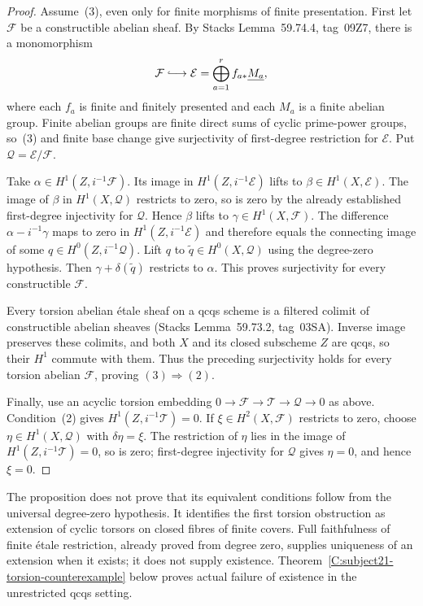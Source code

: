 \begin{proof}
Assume~(3), even only for finite morphisms of finite presentation.
First let $\mathcal F$ be a constructible abelian sheaf. By Stacks
Lemma~59.74.4, tag~09Z7, there is a monomorphism
\[
 \mathcal F\lhook\joinrel\longrightarrow
 \mathcal E=\bigoplus_{a=1}^{r}f_{a*}\underline{M_a},
\]
where each $f_a$ is finite and finitely presented and each $M_a$ is a
finite abelian group. Finite abelian groups are finite direct sums
of cyclic prime-power groups, so~(3) and finite base change give
surjectivity of first-degree restriction for $\mathcal E$.
Put $\mathcal Q=\mathcal E/\mathcal F$.

Take $\alpha\in H^1(Z,i^{-1}\mathcal F)$. Its image in
$H^1(Z,i^{-1}\mathcal E)$ lifts to $\beta\in H^1(X,\mathcal E)$.
The image of $\beta$ in $H^1(X,\mathcal Q)$ restricts to zero, so is
zero by the already established first-degree injectivity for
$\mathcal Q$. Hence $\beta$ lifts to $\gamma\in H^1(X,\mathcal F)$.
The difference $\alpha-i^{-1}\gamma$ maps to zero in
$H^1(Z,i^{-1}\mathcal E)$ and therefore equals the connecting image
of some $q\in H^0(Z,i^{-1}\mathcal Q)$. Lift $q$ to
$\widetilde q\in H^0(X,\mathcal Q)$ using the degree-zero hypothesis.
Then $\gamma+\delta(\widetilde q)$ restricts to $\alpha$.
This proves surjectivity for every constructible $\mathcal F$.

Every torsion abelian \'etale sheaf on a qcqs scheme is a filtered
colimit of constructible abelian sheaves (Stacks Lemma~59.73.2,
tag~03SA). Inverse image preserves these colimits, and both $X$ and
its closed subscheme $Z$ are qcqs, so their $H^1$ commute with them.
Thus the preceding surjectivity holds for every torsion abelian
$\mathcal F$, proving $(3)\Rightarrow(2)$.

Finally, use an acyclic torsion embedding
$0\to\mathcal F\to\mathcal T\to\mathcal Q\to0$ as above.
Condition~(2) gives $H^1(Z,i^{-1}\mathcal T)=0$.
If $\xi\in H^2(X,\mathcal F)$ restricts to zero, choose
$\eta\in H^1(X,\mathcal Q)$ with $\delta\eta=\xi$.
The restriction of $\eta$ lies in the image of
$H^1(Z,i^{-1}\mathcal T)=0$, so is zero; first-degree injectivity
for $\mathcal Q$ gives $\eta=0$, and hence $\xi=0$.
\end{proof}

The proposition does not prove that its equivalent conditions follow
from the universal degree-zero hypothesis. It identifies the first
torsion obstruction as extension of cyclic torsors on
closed fibres of finite covers. Full faithfulness of finite \'etale
restriction, already proved from degree zero, supplies uniqueness
of an extension when it exists; it does not supply existence.
Theorem~\ref{C:subject21-torsion-counterexample} below proves actual
failure of existence in the unrestricted qcqs setting.


